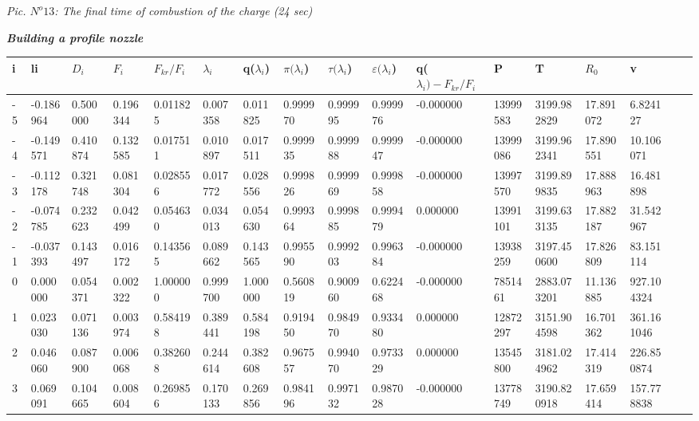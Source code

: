 \begin{flushright}
\textit{ Pic. $N^o 13$: The final time of combustion of the charge (24 sec) } \\
\end{flushright}
\newpage

\begin{center}
\begin{large}
\textbf{\textit { Building a profile nozzle }} \\
\end{large}
\end{center}
\begin{center}
\begin{tabular}{|l*{16}{l|}}
\hline
i & li & \(D_i\) & \(F_i\) & \(F_{kr}/F_i\) & $\lambda_i$ & q($\lambda_i$) & $\pi(\lambda_i$) & $\tau(\lambda_i$) & $\varepsilon(\lambda_i$) & q($\lambda_i) - F_{kr}/F_i$ & P & T & \(R_0\) & v  \\
\hline
-5 & -0.186964 & 0.500000 & 0.196344 & 0.011825 & 0.007358 & 0.011825 & 0.999970 & 0.999995 & 0.999976 & -0.000000 & 13999583 & 3199.982829 & 17.891072 & 6.824127 \\
-4 & -0.149571 & 0.410874 & 0.132585 & 0.017511 & 0.010897 & 0.017511 & 0.999935 & 0.999988 & 0.999947 & -0.000000 & 13999086 & 3199.962341 & 17.890551 & 10.106071 \\
-3 & -0.112178 & 0.321748 & 0.081304 & 0.028556 & 0.017772 & 0.028556 & 0.999826 & 0.999969 & 0.999858 & -0.000000 & 13997570 & 3199.899835 & 17.888963 & 16.481898 \\
-2 & -0.074785 & 0.232623 & 0.042499 & 0.054630 & 0.034013 & 0.054630 & 0.999364 & 0.999885 & 0.999479 & 0.000000 & 13991101 & 3199.633135 & 17.882187 & 31.542967 \\
-1 & -0.037393 & 0.143497 & 0.016172 & 0.143565 & 0.089662 & 0.143565 & 0.995590 & 0.999203 & 0.996384 & -0.000000 & 13938259 & 3197.450600 & 17.826809 & 83.151114 \\
0 & 0.000000 & 0.054371 & 0.002322 & 1.000000 & 0.999700 & 1.000000 & 0.560819 & 0.900960 & 0.622468 & -0.000000 & 7851461 & 2883.073201 & 11.136885 & 927.104324 \\
1 & 0.023030 & 0.071136 & 0.003974 & 0.584198 & 0.389441 & 0.584198 & 0.919450 & 0.984970 & 0.933480 & 0.000000 & 12872297 & 3151.904598 & 16.701362 & 361.161046 \\
2 & 0.046060 & 0.087900 & 0.006068 & 0.382608 & 0.244614 & 0.382608 & 0.967557 & 0.994070 & 0.973329 & 0.000000 & 13545800 & 3181.024962 & 17.414319 & 226.850874 \\
3 & 0.069091 & 0.104665 & 0.008604 & 0.269856 & 0.170133 & 0.269856 & 0.984196 & 0.997132 & 0.987028 & -0.000000 & 13778749 & 3190.820918 & 17.659414 & 157.778838 \\

\end{tabular}
\end{center}
